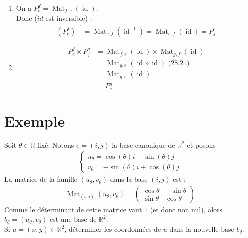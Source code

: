 \documentclass[../main.tex]{subfiles}
\begin{document}
\begin{enumerate}
    \item On a $P_e^f = \operatorname{Mat}_{f,e}(\operatorname{id})$. \\
    Donc ($id$ est inversible) : 
    \begin{align*}
        (P_e^f)^{-1} = \operatorname{Mat}_{e,f}(\operatorname{id}^{-1}) = \operatorname{Mat}_{e,f}(\operatorname{id}) = P_f^e
    \end{align*}

    \item \begin{align*}
        P_e^f\times P_f^g &= \operatorname{Mat}_{f,e}(\operatorname{id})\times \operatorname{Mat}_{g,f}(\operatorname{id}) \\
        &= \operatorname{Mat}_{g,e}(\operatorname{id}\circ \operatorname{id}) \text{ (28.21)} \\
        &= \operatorname{Mat}_{g,e}(\operatorname{id}) \\
        &= P_e^g
    \end{align*}
\end{enumerate}

\section{Exemple}
\begin{tcolorbox}[title=Exemple 28.41, title filled=false, colframe=darkgreen, colback=darkgreen!10!white]
    Soit $\theta \in \mathbb{R}$ fixé. Notons $e=(i, j)$ la base canonique de $\mathbb{R}^2$ et posons
    \begin{align*}
        \begin{cases}
            u_\theta=\cos (\theta) i+\sin (\theta) j \\
            v_\theta=-\sin (\theta) i+\cos (\theta) j
        \end{cases}
    \end{align*}
    La matrice de la famille $\left(u_\theta, v_\theta\right)$ dans la base $(i, j)$ est :
    \begin{align*}
        \operatorname{Mat}_{(i, j)}\left(u_\theta, v_\theta\right)=\begin{pmatrix}
        \cos \theta & -\sin \theta \\
        \sin \theta & \cos \theta
        \end{pmatrix}
    \end{align*}
    Comme le déterminant de cette matrice vaut $1$ (et donc non nul), alors $b_\theta = (u_\theta, v_\theta)$ est une base de $\mathbb{R}^2$. \\
    Si $u = (x, y)\in \mathbb{R}^2$, déterminer les coordonnées de $u$ dans la nouvelle base $b_\theta$.
\end{tcolorbox}
\end{document}
